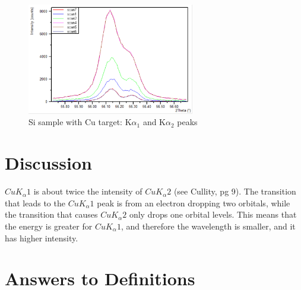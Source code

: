 \documentclass{article}
\begin{document}
\begin{figure}[h]
\begin{center}
\includegraphics[width=0.65\textwidth]{lindamaggietutorial1} %
\caption{Si sample with Cu target: K$\alpha_1$ and K$\alpha_2$ peaks }
\end{center}
\end{figure}


\section{Discussion}
$CuK_\alpha1$ is about twice the intensity of $CuK_\alpha2$ (see Cullity, pg 9). The transition that leads to the $CuK_\alpha1$ peak is from an electron dropping two orbitals, while the transition that causes $CuK_\alpha2$ only drops one orbital levels. This means that the energy is greater for $CuK_\alpha1$, and therefore the wavelength is smaller, and it has higher intensity. 




\section{Answers to Definitions}
\end{document}
